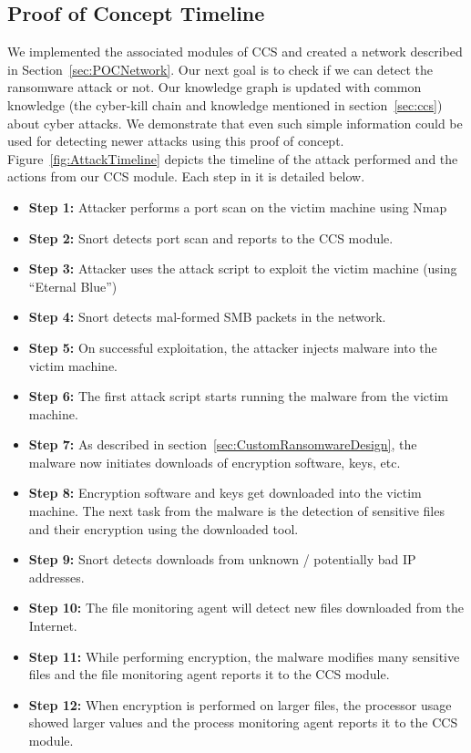 \subsection{Proof of Concept Timeline}

We implemented the associated modules of CCS and created a network described in Section~\ref{sec:POCNetwork}. Our next goal is to check if we can detect the ransomware attack or not. Our knowledge graph is updated with common knowledge (the cyber-kill chain and knowledge mentioned in section~\ref{sec:ccs}) about cyber attacks. We demonstrate that even such simple information could be used for detecting newer attacks using this proof of concept. 
Figure~\ref{fig:AttackTimeline} depicts the timeline of the attack performed and the actions from our CCS module. Each step in it is detailed below. 

\begin{itemize}
	\item {\bf Step 1: }Attacker performs a port scan on the victim machine using Nmap
	\item {\bf Step 2: }Snort detects port scan and reports to the CCS module. 
	\item {\bf Step 3: }Attacker uses the attack script to exploit the victim machine (using ``Eternal Blue'')
	\item {\bf Step 4: }Snort detects mal-formed SMB packets in the network.
	\item {\bf Step 5: }On successful exploitation, the attacker injects malware into the victim machine.
	\item {\bf Step 6: }The first attack script starts running the malware from the victim machine.
	\item {\bf Step 7: }As described in section~\ref{sec:CustomRansomwareDesign}, the malware now initiates downloads of encryption software, keys, etc. 
	\item {\bf Step 8: }Encryption software and keys get downloaded into the victim machine. The next task from the malware is the detection of sensitive files and their encryption using the downloaded tool.
	\item {\bf Step 9: }Snort detects downloads from unknown / potentially bad IP addresses.
	\item {\bf Step 10: }The file monitoring agent will detect new files downloaded from the Internet.
	\item {\bf Step 11: }While performing encryption, the malware modifies many sensitive files and the file monitoring agent reports it to the CCS module.
	\item {\bf Step 12: }When encryption is performed on larger files, the processor usage showed larger values and the process monitoring agent reports it to the CCS module.
\end{itemize}

